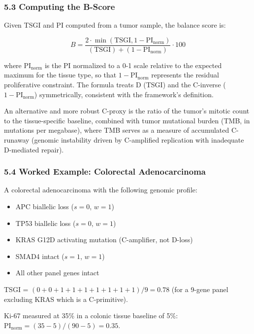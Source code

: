 \documentclass[
  11pt,
  letterpaper,
]{article}
\providecommand{\tightlist}{%
  \setlength{\itemsep}{0pt}\setlength{\parskip}{0pt}}
\begin{document}
\subsubsection{5.3 Computing the B-Score}\label{computing-the-b-score}

Given TSGI and PI computed from a tumor sample, the balance score is:

\[B = \frac{2 \cdot \min(\text{TSGI}, 1 - \text{PI}_\text{norm})}{(\text{TSGI}) + (1 - \text{PI}_\text{norm})} \cdot 100\]

where \(\text{PI}_\text{norm}\) is the PI normalized to a 0-1 scale
relative to the expected maximum for the tissue type, so that
\(1 - \text{PI}_\text{norm}\) represents the residual proliferative
constraint. The formula treats D (TSGI) and the C-inverse
(\(1 - \text{PI}_\text{norm}\)) symmetrically, consistent with the
framework's definition.

An alternative and more robust C-proxy is the ratio of the tumor's
mitotic count to the tissue-specific baseline, combined with tumor
mutational burden (TMB, in mutations per megabase), where TMB serves as
a measure of accumulated C-runaway (genomic instability driven by
C-amplified replication with inadequate D-mediated repair).

\subsubsection{5.4 Worked Example: Colorectal
Adenocarcinoma}\label{worked-example-colorectal-adenocarcinoma}

A colorectal adenocarcinoma with the following genomic profile:

\begin{itemize}
\tightlist
\item
  APC biallelic loss (\(s = 0\), \(w = 1\))
\item
  TP53 biallelic loss (\(s = 0\), \(w = 1\))
\item
  KRAS G12D activating mutation (C-amplifier, not D-loss)
\item
  SMAD4 intact (\(s = 1\), \(w = 1\))
\item
  All other panel genes intact
\end{itemize}

TSGI = \((0 + 0 + 1 + 1 + 1 + 1 + 1 + 1 + 1)/9 = 0.78\) (for a 9-gene
panel excluding KRAS which is a C-primitive).

Ki-67 measured at 35\% in a colonic tissue baseline of 5\%:
\(\text{PI}_\text{norm} = (35-5)/(90-5) = 0.35\).
\end{document}

